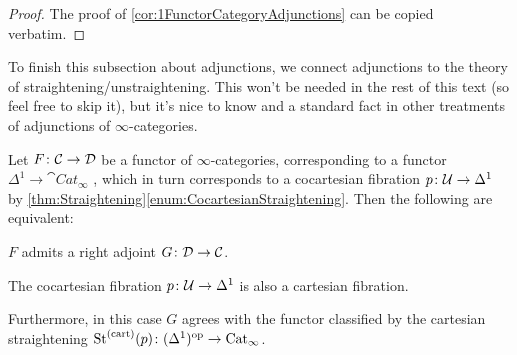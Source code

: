 \begin{proof}
	The proof of \cref{cor:1FunctorCategoryAdjunctions} can be copied verbatim.
\end{proof}
To finish this subsection about adjunctions, we connect adjunctions to the theory of straightening/unstraightening. This won't be needed in the rest of this text (so feel free to skip it), but it's nice to know and a standard fact in other treatments of adjunctions of $\infty$-categories.
\begin{lem}\label{lem:AdjunctionBicartesian}
	Let $F\colon \mathcal{C}\rightarrow \mathcal{D}$ be a functor of $\infty$-categories, corresponding to a functor $\Delta^1\rightarrow \cat{Cat}_\infty$ , which in turn corresponds to a cocartesian fibration $p\colon \mathcal{U}\rightarrow \Delta^1$ by \cref{thm:Straightening}\cref{enum:CocartesianStraightening}. Then the following are equivalent:
	\begin{alphanumerate}
		\item $F$ admits a right adjoint $G\colon \mathcal{D}\rightarrow \mathcal{C}$.\label{enum:BicartesianAdjoint}
		\item \!The cocartesian fibration $p\colon \mathcal{U}\rightarrow \Delta^1$ is also a cartesian fibration.\label{enum:Bicartesian}
	\end{alphanumerate}
	Furthermore, in this case $G$ agrees with the functor classified by the cartesian straightening $\operatorname{St}^{(\mathrm{cart})}(p)\colon (\Delta^1)^{\mathrm{op}}\rightarrow \mathrm{Cat}_\infty$.
\end{lem}
